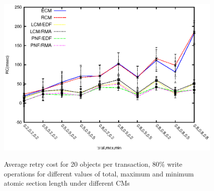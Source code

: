 \documentclass[12pt,english]{report}
\begin{document}
\begin{figure}
{\includegraphics[scale=0.7]
{figures/Abr_dur_20t_210obj_80wr.eps}
\label{fig:20t_ecm_rcm_lcm_pnf_210obj_80wr}
}
\caption{Average retry cost for 20 objects per transaction, 80\% write operations for different values of total, maximum and minimum atomic section length under different CMs}
\label{fig:cm_20obj_per_tx_80wr}
\end{figure}
\end{document}
